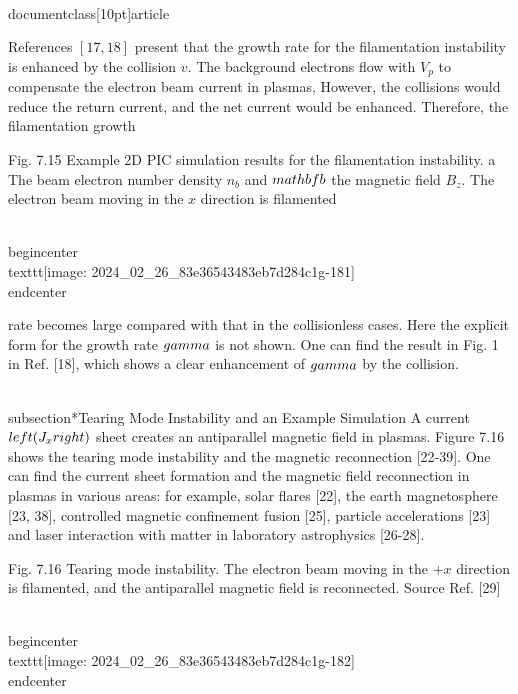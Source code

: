 \\documentclass[10pt]{article}
\begin{document}
{{{{References $[17,18]$ present that the growth rate for the filamentation instability is enhanced by the collision $v$. The background electrons flow with $V_{p}$ to compensate the electron beam current in plasmas, However, the collisions would reduce the return current, and the net current would be enhanced. Therefore, the filamentation growth

Fig. 7.15 Example 2D PIC simulation results for the filamentation instability. a The beam electron number density $n_{b}$ and $\\mathbf{b}$ the magnetic field $B_{z}$. The electron beam moving in the $x$ direction is filamented

\\begin{center}
\\texttt{[image: 2024\_02\_26\_83e36543483eb7d284c1g-181]}
\\end{center}

rate becomes large compared with that in the collisionless cases. Here the explicit form for the growth rate $\\gamma$ is not shown. One can find the result in Fig. 1 in Ref. [18], which shows a clear enhancement of $\\gamma$ by the collision.

\\subsection*{Tearing Mode Instability and an Example Simulation}
A current $\\left(J_{x}\\right)$ sheet creates an antiparallel magnetic field in plasmas. Figure 7.16 shows the tearing mode instability and the magnetic reconnection [22-39]. One can find the current sheet formation and the magnetic field reconnection in plasmas in various areas: for example, solar flares [22], the earth magnetosphere [23, 38], controlled magnetic confinement fusion [25], particle accelerations [23] and laser interaction with matter in laboratory astrophysics [26-28].

Fig. 7.16 Tearing mode instability. The electron beam moving in the $+x$ direction is filamented, and the antiparallel magnetic field is reconnected. Source Ref. [29]

\\begin{center}
\\texttt{[image: 2024\_02\_26\_83e36543483eb7d284c1g-182]}
\\end{center}

}}}}
\end{document}
